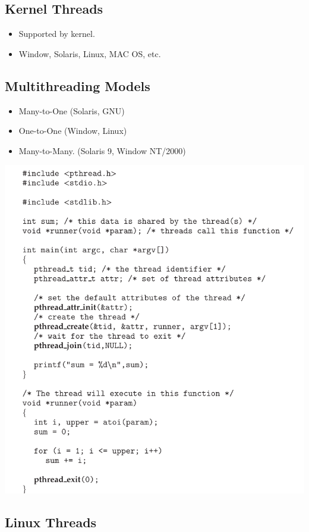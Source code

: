 \documentclass[10pt]{article}
\begin{document}
\subsection{Kernel Threads}

\begin{itemize}
	\item Supported by kernel.
	\item Window, Solaris, Linux, MAC OS, etc. 
\end{itemize}

\subsection{Multithreading Models}

\begin{itemize}
	\item Many-to-One (Solaris, GNU)
	\item One-to-One (Window, Linux)
	\item Many-to-Many. (Solaris 9, Window NT/2000)
\end{itemize}

\bigbreak
\includegraphics[scale = 0.7]{phtread.png}
\bigbreak

\subsection{Linux Threads}
\end{document}
